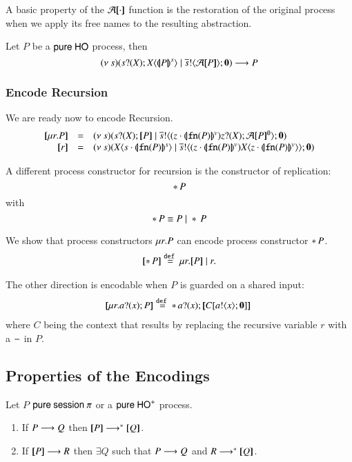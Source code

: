 A basic property of the $\mathcal{A}[\!\![\cdot]\!\!]$ function
is the restoration of the original process when we
apply its free names to the resulting abstraction.

\begin{proposition}
	Let $P$ be a $\mathsf{pure\ HO}$ process, then
	\[
		\newsp{s}{\binp{s}{X} \appl{\X}{\smap{P}} \Par \bout{\dual{s}}{\amap{P}}\inact} \red P
	\]
\end{proposition}


\subsubsection{Encode Recursion}
We are ready now to encode Recursion.
%
\[
\begin{array}{rcl}
	\map{\rec{r}{P}} &=& \newsp{s}{\binp{s}{\X} \map{P} \Par \bout{\dual{s}}{\abs{z \cat \vmap{\fn{P}}}{\binp{z}{\X} \absmap{P}{\es}}} \inact}\\
	\map{\varp{r}} &=& \newsp{s}{\appl{\X}{s \cat \smap{\fn{P}}} \Par \bout{\dual{s}}{ \abs{z \cat \vmap{\fn{P}}}{\appl{X}{z \cat \vmap{\fn{P}}}}} \inact}
\end{array}
\]
%

A different process constructor for recursion is the constructor of replication:
\[
	\ast\,{} P
\]
with
\[
	\ast\,{} P \equiv P \;|\; \ast\,{} P
\]

We show that process constructors $\mu r. P$ can encode process constructor $\ast\,{} P$.
\[
\begin{array}{rcl}
	\map{\repl{} P} \defeq \recp{r}{\map{P} \Par r}.
\end{array}
\]

The other direction is encodable when $P$ is guarded on a shared input:
\[
\begin{array}{rcl}
	\map{\recp{r} \binp{a}{x} P} \defeq \repl{} \binp{a}{x} \map{\context{C}{\bout{a}{x} \inact}}\
\end{array}
\]
where $C$ being the context that results by replacing the recursive variable $r$
with a $-$ in $P$.

\subsection{Properties of the Encodings}

\begin{proposition}
	Let $P$ $\mathsf{pure\ session\ }\pi$ or a $\mathsf{pure\ HO}^+$ process.
	\begin{enumerate}
		\item	If $P \longrightarrow Q$ then $\map{P} \red^* \map{Q}$.
		\item	If $[\!\![P]\!\!] \longrightarrow R$ then $\exists Q$ such that $P \longrightarrow Q$ and $R \longrightarrow^* [\!\![Q]\!\!]$.
	\end{enumerate}
\end{proposition}

